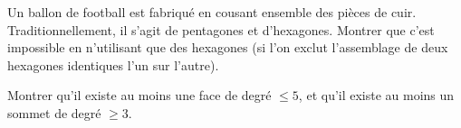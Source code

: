 \begin{exo}
Un ballon de football  est fabriqué en cousant ensemble des pièces de cuir. Traditionnellement, il s'agit de pentagones et d'hexagones. Montrer que c'est impossible en n'utilisant que des hexagones (si l'on exclut l'assemblage de deux hexagones identiques l'un sur l'autre). 


\begin{hint}
Montrer qu'il existe au moins une face de degré $\leq 5$, et qu'il existe au moins un sommet de degré $\geq 3$. 
\end{hint}
\begin{sol}

\end{sol}
\end{exo}

